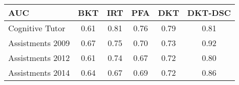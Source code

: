 \begin{tabular}[]{lccccc}
\toprule
AUC & BKT & IRT & PFA & DKT & DKT-DSC
\tabularnewline
\midrule
Cognitive Tutor & 0.61 & \alert{0.81} & 0.76 & 0.79 & \alert{0.81}\tabularnewline
Assistments 2009 & 0.67 & 0.75 & 0.70 & 0.73 & \alert{0.92}\tabularnewline
Assistments 2012 & 0.61 & 0.74 & 0.67 & 0.72 & \alert{0.80}\tabularnewline
Assistments 2014 & 0.64 & 0.67 & 0.69 & 0.72 & \alert{0.86}\tabularnewline
\bottomrule
\end{tabular}
